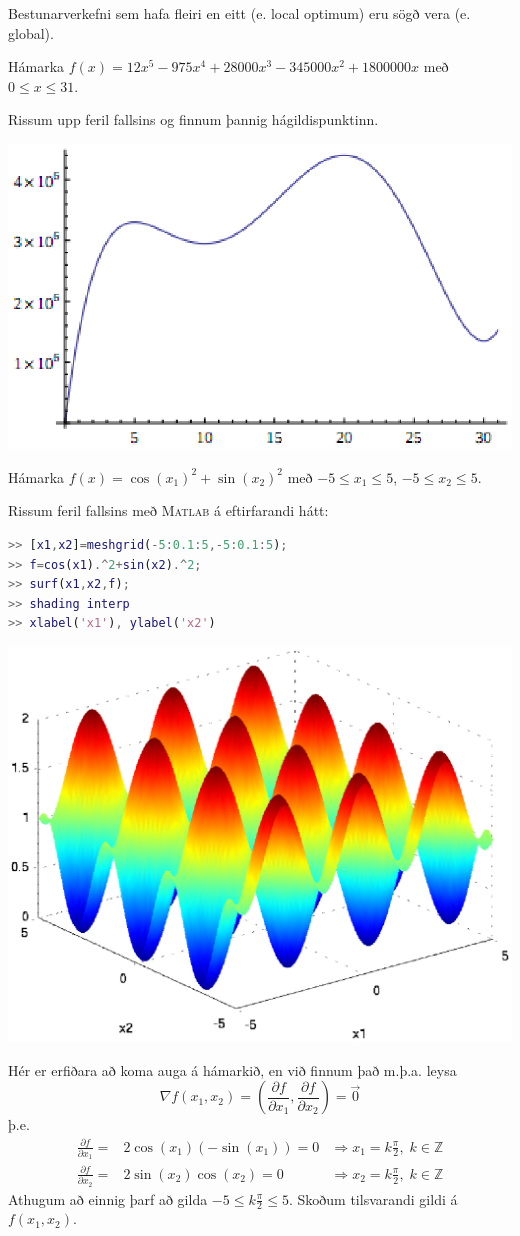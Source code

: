 Bestunarverkefni sem hafa fleiri en eitt  (e. local optimum) eru sögð vera  (e. global).


\begin{daemi}
  Hámarka $f(x)=12x^5-975x^4+28000x^3-345000x^2+1800000x$ með $0\leq x\leq 31$. 
\end{daemi}
\begin{lausnSYND}
Rissum upp feril fallsins og finnum þannig hágildispunktinn.
\begin{center}
  \includegraphics[width=0.5\columnwidth]{figs/global_opt.eps}
\end{center}
\end{lausnSYND}


\begin{daemi}
  Hámarka $f(x)=\cos(x_1)^2+\sin(x_2)^2$ með $-5\leq x_1\leq 5$, $-5\leq x_2\leq 5$. 
\end{daemi}
\begin{lausnSYND}
  Rissum feril fallsins með \textsc{Matlab} á eftirfarandi hátt:
\begin{lstlisting}[language=matlab]
>> [x1,x2]=meshgrid(-5:0.1:5,-5:0.1:5);
>> f=cos(x1).^2+sin(x2).^2;
>> surf(x1,x2,f);
>> shading interp
>> xlabel('x1'), ylabel('x2')
\end{lstlisting}
\begin{center}
  \includegraphics[width=0.7\columnwidth]{figs/global_opt2.eps}
\end{center}
Hér er erfiðara að koma auga á hámarkið, en við finnum það m.þ.a. leysa 
\[\nabla f(x_1,x_2)=\left(\frac{\partial f}{\partial x_1},\frac{\partial f}{\partial x_2}\right)=\vec{0}\]
þ.e.
\begin{eqnarray*}
\frac{\partial f}{\partial x_1}=&2\cos(x_1)\left(-\sin(x_1)\right)=0 &\Rightarrow x_1=k\frac{\pi}{2},\;k\in\mathbb{Z}\\
\frac{\partial f}{\partial x_2}=&2\sin(x_2)\cos(x_2)=0 &\Rightarrow x_2=k\frac{\pi}{2},\;k\in\mathbb{Z}
\end{eqnarray*}
Athugum að einnig þarf að gilda $-5\leq k\frac{\pi}{2}\leq 5$. Skoðum tilsvarandi gildi á $f(x_1,x_2)$.
\end{lausnSYND}

